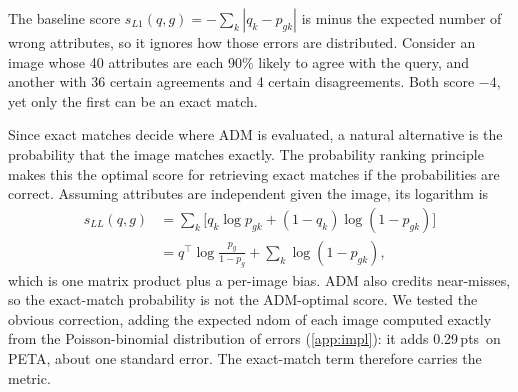 \documentclass[10pt,twocolumn,letterpaper]{article}
\newcommand{\pts}{\,pts}
\begin{document}
The baseline score $s_{L1}(q,g)=-\sum_k|q_k-p_{gk}|$ is minus the expected number of wrong attributes, so it ignores how those errors are distributed. Consider an image whose 40 attributes are each 90\% likely to agree with the query, and another with 36 certain agreements and 4 certain disagreements. Both score $-4$, yet only the first can be an exact match.

Since exact matches decide where ADM is evaluated, a natural alternative is the probability that the image matches exactly. The probability ranking principle~\cite{prp} makes this the optimal score for retrieving exact matches if the probabilities are correct. Assuming attributes are independent given the image, its logarithm is
\begin{equation}
\begin{aligned}
s_{LL}(q,g)&=\sum_{k}\big[q_k\log p_{gk}+(1-q_k)\log(1-p_{gk})\big]\\
&=q^\top\!\log\tfrac{p_g}{1-p_g}+\textstyle\sum_k\log(1-p_{gk}),
\end{aligned}
\label{eq:ll}
\end{equation}
which is one matrix product plus a per-image bias. ADM also credits near-misses, so the exact-match probability is not the ADM-optimal score. We tested the obvious correction, adding the expected ndom of each image computed exactly from the Poisson-binomial distribution of errors (\cref{app:impl}): it adds 0.29\pts\ on PETA, about one standard error. The exact-match term therefore carries the metric.

\begin{table}[t]
\centering\small
\setlength{\tabcolsep}{3pt}
\caption{L1 versus log-likelihood (LL) ranking. Top: six metrics for a distilled ViT-L on PETA held out (values $\times100$). Bottom: the mADM gain for every run with saved logits.}
\label{tab:llvsl1}
\end{table}
\end{document}
